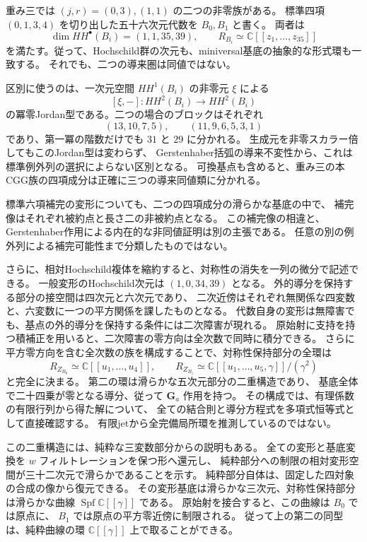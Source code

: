 重み三では $(j,r)=(0,3),(1,1)$ の二つの非零族がある。
標準四項 $(0,1,3,4)$ を切り出した五十六次元代数を $B_0,B_1$ と書く。
両者は
\[
 \dim HH^\bullet(B_i)=(1,1,35,39),\qquad
 R_{B_i}\simeq\mathbb C[[z_1,\ldots,z_{35}]]
\]
を満たす。従って、Hochschild群の次元も、miniversal基底の抽象的な形式環も一致する。
それでも、二つの導来圏は同値ではない。

区別に使うのは、一次元空間 $HH^1(B_i)$ の非零元 $\xi$ による
\[
 [\xi,-]:HH^2(B_i)\longrightarrow HH^2(B_i)
\]
の冪零Jordan型である。二つの場合のブロックはそれぞれ
\[
 (13,10,7,5),\qquad (11,9,6,5,3,1)
\]
であり、第一冪の階数だけでも $31$ と $29$ に分かれる。
生成元を非零スカラー倍してもこのJordan型は変わらず、
Gerstenhaber括弧の導来不変性から、これは標準例外列の選択によらない区別となる。
可換基点も含めると、重み三の本CGG族の四項成分は正確に三つの導来同値類に分かれる。

標準六項補完の変形についても、二つの四項成分の滑らかな基底の中で、
補完像はそれぞれ被約点と長さ二の非被約点となる。
この補完像の相違と、Gerstenhaber作用による内在的な非同値証明は別の主張である。
任意の別の例外列による補完可能性まで分類したものではない。


さらに、相対Hochschild複体を縮約すると、対称性の消失を一列の微分で記述できる。
一般変形のHochschild次元は $(1,0,34,39)$ となる。
外的導分を保持する部分の接空間は四次元と六次元であり、
二次近傍はそれぞれ無関係な四変数と、六変数に一つの平方関係を課したものとなる。
代数自身の変形は無障害でも、基点の外的導分を保持する条件には二次障害が現れる。
原始射に支持を持つ積補正を用いると、二次障害の零方向は全次数で同時に積分できる。
さらに平方零方向を含む全次数の族を構成することで、対称性保持部分の全環は
\[
 R_{Z_{B_0}}\simeq\mathbb C[[u_1,\ldots,u_4]],\qquad
 R_{Z_{B_1}}\simeq
       \mathbb C[[u_1,\ldots,u_5,\gamma]]/(\gamma^2)
\]
と完全に決まる。
第二の環は滑らかな五次元部分の二重構造であり、
基底全体で二十四乗が零となる導分、従って $\mathbf G_a$ 作用を持つ。
その構成では、有理係数の有限行列から得た解について、
全ての結合則と導分方程式を多項式恒等式として直接確認する。
有限jetから全完備局所環を推測しているのではない。

この二重構造には、純粋な三変数部分からの説明もある。
全ての変形と基底変換を $w$ フィルトレーションを保つ形へ還元し、
純粋部分への制限の相対変形空間が三十二次元で滑らかであることを示す。
純粋部分自体は、固定した四対象の合成の像から復元できる。
その変形基底は滑らかな三次元、対称性保持部分は滑らかな曲線
$\operatorname{Spf}\mathbb C[[\gamma]]$ である。
原始射を接合すると、この曲線は $B_0$ では原点に、
$B_1$ では原点の平方零近傍に制限される。
従って上の第二の同型は、純粋曲線の環 $\mathbb C[[\gamma]]$ 上で取ることができる。

